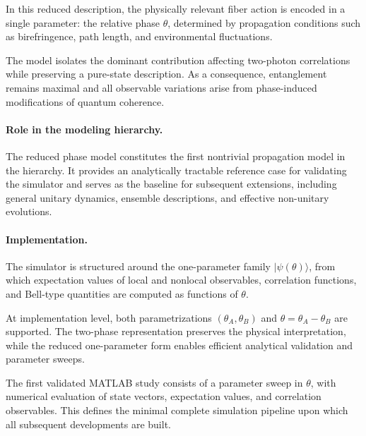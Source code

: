 \documentclass[a4paper]{article}
\begin{document}
In this reduced description, the physically relevant fiber action is encoded in a single parameter: the relative phase \( \theta \), determined by propagation conditions such as birefringence, path length, and environmental fluctuations.

The model isolates the dominant contribution affecting two-photon correlations while preserving a pure-state description. As a consequence, entanglement remains maximal and all observable variations arise from phase-induced modifications of quantum coherence.

\medskip

\paragraph{Role in the modeling hierarchy.}

The reduced phase model constitutes the first nontrivial propagation model in the hierarchy. It provides an analytically tractable reference case for validating the simulator and serves as the baseline for subsequent extensions, including general unitary dynamics, ensemble descriptions, and effective non-unitary evolutions.

\medskip

\paragraph{Implementation.}

The simulator is structured around the one-parameter family \( |\psi(\theta)\rangle \), from which expectation values of local and nonlocal observables, correlation functions, and Bell-type quantities are computed as functions of \( \theta \).

At implementation level, both parametrizations \( (\theta_A, \theta_B) \) and \( \theta = \theta_A - \theta_B \) are supported. The two-phase representation preserves the physical interpretation, while the reduced one-parameter form enables efficient analytical validation and parameter sweeps.

The first validated MATLAB study consists of a parameter sweep in \( \theta \), with numerical evaluation of state vectors, expectation values, and correlation observables. This defines the minimal complete simulation pipeline upon which all subsequent developments are built.

\end{document}
